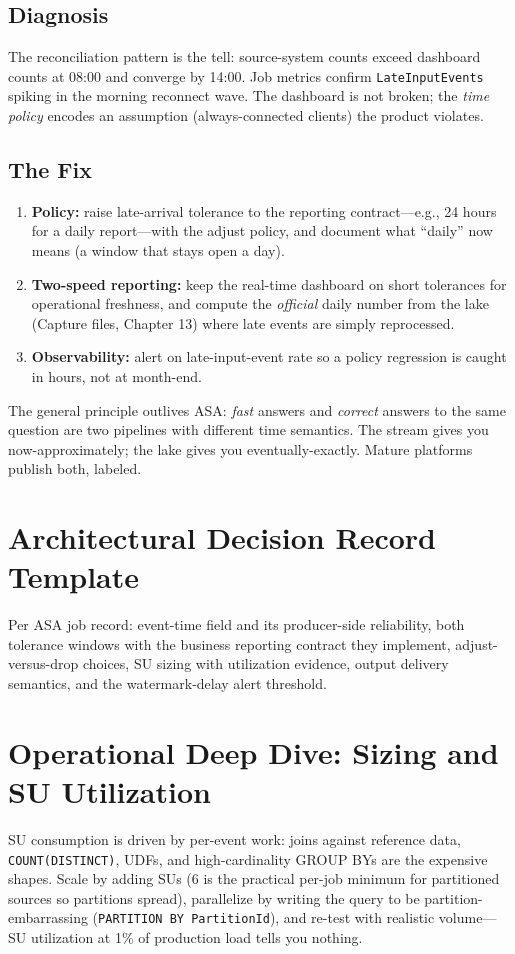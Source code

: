 \subsection{Diagnosis}
The reconciliation pattern is the tell: source-system counts exceed dashboard counts at 08:00 and converge by 14:00. Job metrics confirm \texttt{LateInputEvents} spiking in the morning reconnect wave. The dashboard is not broken; the \emph{time policy} encodes an assumption (always-connected clients) the product violates.

\subsection{The Fix}
\begin{enumerate}
    \item \textbf{Policy:} raise late-arrival tolerance to the reporting contract---e.g., 24 hours for a daily report---with the adjust policy, and document what ``daily'' now means (a window that stays open a day).
    \item \textbf{Two-speed reporting:} keep the real-time dashboard on short tolerances for operational freshness, and compute the \emph{official} daily number from the lake (Capture files, Chapter 13) where late events are simply reprocessed.
    \item \textbf{Observability:} alert on late-input-event rate so a policy regression is caught in hours, not at month-end.
\end{enumerate}

\begin{notebox}
The general principle outlives ASA: \emph{fast} answers and \emph{correct} answers to the same question are two pipelines with different time semantics. The stream gives you now-approximately; the lake gives you eventually-exactly. Mature platforms publish both, labeled.
\end{notebox}

\section{Architectural Decision Record Template}
Per ASA job record: event-time field and its producer-side reliability, both tolerance windows with the business reporting contract they implement, adjust-versus-drop choices, SU sizing with utilization evidence, output delivery semantics, and the watermark-delay alert threshold.

\section{Operational Deep Dive: Sizing and SU Utilization}
SU consumption is driven by per-event work: joins against reference data, \texttt{COUNT(DISTINCT)}, UDFs, and high-cardinality GROUP BYs are the expensive shapes. Scale by adding SUs (6 is the practical per-job minimum for partitioned sources so partitions spread), parallelize by writing the query to be partition-embarrassing (\texttt{PARTITION BY PartitionId}), and re-test with realistic volume---SU utilization at 1\% of production load tells you nothing.

